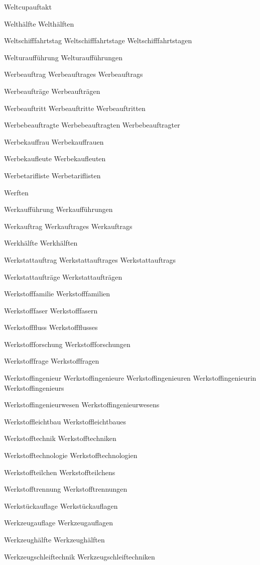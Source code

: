 Weltcupauftakt

Welthälfte
Welthälften

Weltschifffahrtstag
Weltschifffahrtstage
Weltschifffahrtstagen

Welturaufführung
Welturaufführungen

Werbeauftrag
Werbeauftrages
Werbeauftrags

Werbeaufträge
Werbeaufträgen

Werbeauftritt
Werbeauftritte
Werbeauftritten

Werbebeauftragte
Werbebeauftragten
Werbebeauftragter

Werbekauffrau
Werbekauffrauen

Werbekaufleute
Werbekaufleuten

Werbetarifliste
Werbetariflisten

Werften

Werkaufführung
Werkaufführungen

Werkauftrag
Werkauftrages
Werkauftrags

Werkhälfte
Werkhälften

Werkstattauftrag
Werkstattauftrages
Werkstattauftrags

Werkstattaufträge
Werkstattaufträgen

Werkstofffamilie
Werkstofffamilien

Werkstofffaser
Werkstofffasern

Werkstofffluss
Werkstoffflusses

Werkstoffforschung
Werkstoffforschungen

Werkstofffrage
Werkstofffragen

Werkstoffingenieur
Werkstoffingenieure
Werkstoffingenieuren
Werkstoffingenieurin
Werkstoffingenieurs

Werkstoffingenieurwesen
Werkstoffingenieurwesens

Werkstoffleichtbau
Werkstoffleichtbaues

Werkstofftechnik
Werkstofftechniken

Werkstofftechnologie
Werkstofftechnologien

Werkstoffteilchen
Werkstoffteilchens

Werkstofftrennung
Werkstofftrennungen

Werkstückauflage
Werkstückauflagen

Werkzeugauflage
Werkzeugauflagen

Werkzeughälfte
Werkzeughälften

Werkzeugschleiftechnik
Werkzeugschleiftechniken

